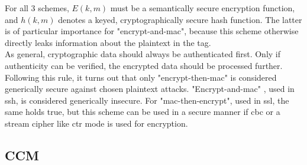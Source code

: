 For all 3 schemes, $E(k, m)$ must be a semantically secure encryption function, and $h(k, m)$ denotes a keyed, cryptographically secure hash function.
The latter is of particular importance for "encrypt-and-mac", because this scheme otherwise directly leaks information about the plaintext in the tag. 
\\
As general, cryptographic data should always be authenticated first. Only if authenticity can be verified,
the encrypted data should be processed further.
Following this rule, it turns out that only "encrypt-then-mac" is considered generically secure against chosen plaintext attacks.
"Encrypt-and-mac" \cite{sshBellare}, used in \gls{ssh}, is considered generically
insecure. For "mac-then-encrypt", used in \gls{ssl}, the same holds true, but this scheme can be used in a secure manner if \gls{cbc} or a stream cipher like 
\gls{ctr} mode is used for encryption.

\subsection{CCM}

